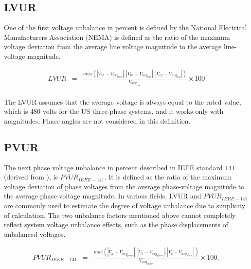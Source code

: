 	
	\subsection{LVUR}\label{BASICUNB:sec:LVUR}
	
	One of the first voltage unbalance in percent is defined by the National Electrical Manufacturers Association (NEMA) \cite{bonnett1997understanding} is defined  as the ratio of the maximum voltage deviation from the average line voltage magnitude to the average line-voltage magnitude.
	
\begin{equation}
        \begin{array}{rcl}
            LVUR&=&\frac{max\left( |V_{ab}-V_{avg_{line}}|,|V_{bc}-V_{avg_{line}}|,|V_{ca}-V_{avg_{line}}| \right)}{V_{avg_{line}}}\times100\\			
        \end{array}
        \label{BASICUNB:equ:LVUR}
    \end{equation}
		
		The LVUR assumes that the average voltage is always equal to the rated value, which is 480 volts for the US three-phase systems, and it works only with magnitudes. Phase angles are not considered in this definition.
	
	\subsection{PVUR}\label{BASICUNB:sec:PVUR}
	
	The next phase voltage unbalance in percent described in IEEE standard $141.$ \cite{IEEE_141_35071} (derived from \cite{IEEE_112_8635630}), is $PVUR_{IEEE-141}$. It is defined as the ratio of the maximum voltage deviation of phase voltages from the average phase-voltage magnitude to the average phase voltage magnitude. In various fields, LVUR and $PVUR_{IEEE-141}$ are commonly used to estimate the degree of voltage unbalance due to simplicity of calculation. The two unbalance factors mentioned above cannot completely reflect system voltage unbalance effects, such as the phase displacements of unbalanced voltages.
	
	\begin{equation}
        \begin{array}{rcl}
            PVUR_{IEEE-141}&=&\frac{max\left( |V_{a}-V_{avg_{phase}}|,|V_{b}-V_{avg_{phase}}|,|V_{c}-V_{avg_{phase}}| \right)}{V_{avg_{phase}}}\times100,\\
        \end{array}
        \label{BASICUNB:equ:PVUR-141}
    \end{equation}

